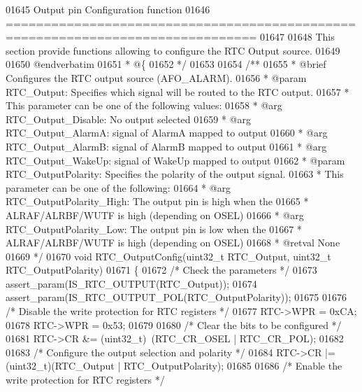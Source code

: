 \begin{DoxyCode}
01645 \textcolor{comment}{                         Output pin Configuration function}
01646 \textcolor{comment}{ ===============================================================================  }
01647 \textcolor{comment}{}
01648 \textcolor{comment}{  This section provide functions allowing to configure the RTC Output source.}
01649 \textcolor{comment}{}
01650 \textcolor{comment}{@endverbatim}
01651 \textcolor{comment}{  * @\{}
01652 \textcolor{comment}{  */}
01653 
01654 \textcolor{comment}{/**}
01655 \textcolor{comment}{  * @brief  Configures the RTC output source (AFO\_ALARM).}
01656 \textcolor{comment}{  * @param  RTC\_Output: Specifies which signal will be routed to the RTC output. }
01657 \textcolor{comment}{  *          This parameter can be one of the following values:}
01658 \textcolor{comment}{  *            @arg RTC\_Output\_Disable: No output selected}
01659 \textcolor{comment}{  *            @arg RTC\_Output\_AlarmA: signal of AlarmA mapped to output}
01660 \textcolor{comment}{  *            @arg RTC\_Output\_AlarmB: signal of AlarmB mapped to output}
01661 \textcolor{comment}{  *            @arg RTC\_Output\_WakeUp: signal of WakeUp mapped to output}
01662 \textcolor{comment}{  * @param  RTC\_OutputPolarity: Specifies the polarity of the output signal. }
01663 \textcolor{comment}{  *          This parameter can be one of the following:}
01664 \textcolor{comment}{  *            @arg RTC\_OutputPolarity\_High: The output pin is high when the }
01665 \textcolor{comment}{  *                                 ALRAF/ALRBF/WUTF is high (depending on OSEL)}
01666 \textcolor{comment}{  *            @arg RTC\_OutputPolarity\_Low: The output pin is low when the }
01667 \textcolor{comment}{  *                                 ALRAF/ALRBF/WUTF is high (depending on OSEL)}
01668 \textcolor{comment}{  * @retval None}
01669 \textcolor{comment}{  */}
01670 \textcolor{keywordtype}{void} RTC_OutputConfig(uint32\_t RTC\_Output, uint32\_t RTC\_OutputPolarity)
01671 \{
01672   \textcolor{comment}{/* Check the parameters */}
01673   assert_param(IS\_RTC\_OUTPUT(RTC\_Output));
01674   assert_param(IS\_RTC\_OUTPUT\_POL(RTC\_OutputPolarity));
01675 
01676   \textcolor{comment}{/* Disable the write protection for RTC registers */}
01677   RTC->WPR = 0xCA;
01678   RTC->WPR = 0x53;
01679 
01680   \textcolor{comment}{/* Clear the bits to be configured */}
01681   RTC->CR &= (uint32\_t)~(RTC_CR_OSEL | RTC_CR_POL);
01682 
01683   \textcolor{comment}{/* Configure the output selection and polarity */}
01684   RTC->CR |= (uint32\_t)(RTC\_Output | RTC\_OutputPolarity);
01685 
01686   \textcolor{comment}{/* Enable the write protection for RTC registers */}

\end{DoxyCode}
